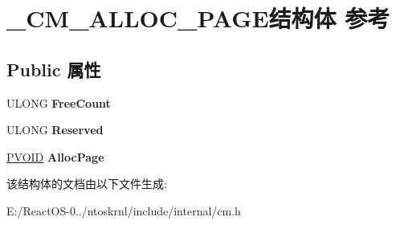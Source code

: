 \hypertarget{struct___c_m___a_l_l_o_c___p_a_g_e}{}\section{\+\_\+\+C\+M\+\_\+\+A\+L\+L\+O\+C\+\_\+\+P\+A\+G\+E结构体 参考}
\label{struct___c_m___a_l_l_o_c___p_a_g_e}
\subsection*{Public 属性}
\begin{DoxyCompactItemize}
\item 
\mbox{\label{struct___c_m___a_l_l_o_c___p_a_g_e_a9c548039f850b35877093759fc924f9b}} 
U\+L\+O\+NG {\bfseries Free\+Count}
\item 
\mbox{\label{struct___c_m___a_l_l_o_c___p_a_g_e_a96bbbdc8902f4702ce3637f404955db9}} 
U\+L\+O\+NG {\bfseries Reserved}
\item 
\mbox{\label{struct___c_m___a_l_l_o_c___p_a_g_e_a2dd53b7684c8009e2e348c0af573b8ad}} 
\hyperlink{interfacevoid}{P\+V\+O\+ID} {\bfseries Alloc\+Page}
\end{DoxyCompactItemize}


该结构体的文档由以下文件生成\+:\begin{DoxyCompactItemize}
\item 
E\+:/\+React\+O\+S-\/0../ntoskrnl/include/internal/cm.\+h\end{DoxyCompactItemize}
